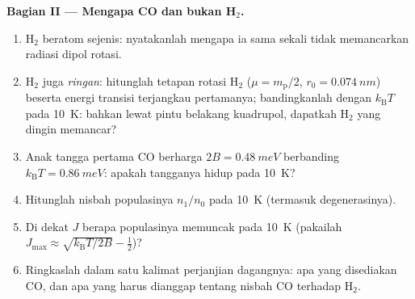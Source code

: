 \begin{problem}
\medskip\noindent\textbf{Bagian II --- Mengapa CO dan bukan H$_2$.}
\begin{enumerate}[resume]
  \item H$_2$ beratom sejenis: nyatakanlah mengapa ia sama sekali
        tidak memancarkan radiasi dipol rotasi.
  \item H$_2$ juga \emph{ringan}: hitunglah tetapan rotasi H$_2$
        ($\mu = m_{\text{p}}/2$, $r_0 = \qty{0.074}{nm}$)
        beserta energi transisi terjangkau pertamanya; bandingkanlah
        dengan $k_{\text{B}}T$ pada \qty{10}{K}: bahkan lewat pintu
        belakang kuadrupol, dapatkah H$_2$ yang dingin memancar?
  \item Anak tangga pertama CO berharga $2B = \qty{0.48}{meV}$
        berbanding $k_{\text{B}}T = \qty{0.86}{meV}$: apakah tangganya
        hidup pada \qty{10}{K}?
  \item Hitunglah nisbah populasinya $n_1/n_0$ pada \qty{10}{K}
        (termasuk degenerasinya).
  \item Di dekat $J$ berapa populasinya memuncak pada \qty{10}{K}
        (pakailah $J_{\max} \approx \sqrt{k_{\text{B}}T/2B} - \tfrac12$)?
  \item Ringkaslah dalam satu kalimat perjanjian dagangnya: apa yang
        disediakan CO, dan apa yang harus dianggap tentang nisbah CO
        terhadap H$_2$.
\end{enumerate}


\end{problem}
